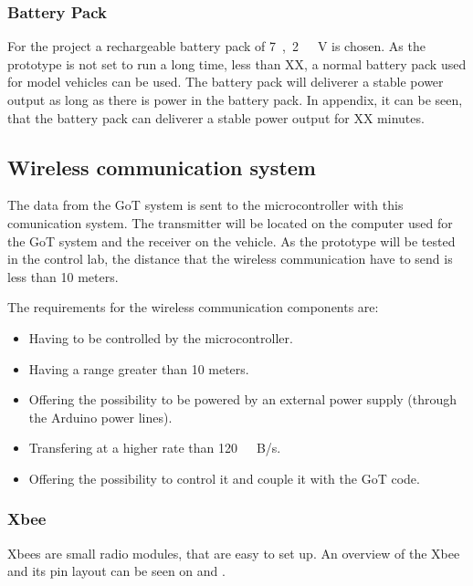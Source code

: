 \subsubsection{Battery Pack}
For the project a rechargeable battery pack of \si{7,2\ V} is chosen. As the prototype is not set to run a long time, less than XX, a normal battery pack used for model vehicles can be used. The battery pack will deliverer a stable power output as long as there is power in the battery pack. In appendix, it can be seen, that the battery pack can deliverer a stable power output for XX minutes.


\subsection{Wireless communication system}
The data from the GoT system is sent to the microcontroller with this comunication system. The transmitter will be located on the computer used for the GoT system and the receiver on the vehicle. As the prototype will be tested in the control lab, the distance that the wireless communication have to send is less than 10 meters.

The requirements for the wireless communication components are:
\begin{itemize}
\item Having to be controlled by the microcontroller.
\item Having a range greater than 10 meters. 
\item Offering the possibility to be powered by an external power supply (through the Arduino power lines).
\item Transfering at a higher rate than \si{120\ B/s}. 
\item Offering the possibility to control it and couple it with the GoT code.
\end{itemize}

\subsubsection{Xbee}
Xbees are small radio modules, that are easy to set up. An overview of the Xbee and its pin layout can be seen on  and .


